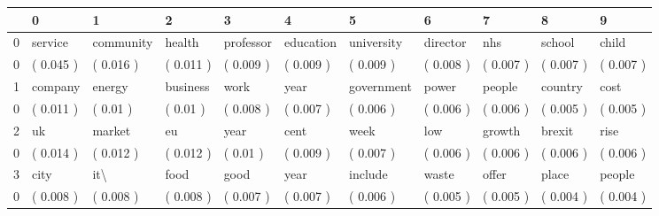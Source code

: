 \begin{tabular}{lllllllllll}
\toprule
{} &          0 &          1 &          2 &          3 &          4 &           5 &          6 &          7 &          8 &          9 \\
\midrule
0 &    service &  community &     health &  professor &  education &  university &   director &        nhs &     school &      child \\
0 &  ( 0.045 ) &  ( 0.016 ) &  ( 0.011 ) &  ( 0.009 ) &  ( 0.009 ) &   ( 0.009 ) &  ( 0.008 ) &  ( 0.007 ) &  ( 0.007 ) &  ( 0.007 ) \\
1 &    company &     energy &   business &       work &       year &  government &      power &     people &    country &       cost \\
0 &  ( 0.011 ) &   ( 0.01 ) &   ( 0.01 ) &  ( 0.008 ) &  ( 0.007 ) &   ( 0.006 ) &  ( 0.006 ) &  ( 0.006 ) &  ( 0.005 ) &  ( 0.005 ) \\
2 &         uk &     market &         eu &       year &       cent &        week &        low &     growth &     brexit &       rise \\
0 &  ( 0.014 ) &  ( 0.012 ) &  ( 0.012 ) &   ( 0.01 ) &  ( 0.009 ) &   ( 0.007 ) &  ( 0.006 ) &  ( 0.006 ) &  ( 0.006 ) &  ( 0.006 ) \\
3 &       city &        it\textbackslash  &       food &       good &       year &     include &      waste &      offer &      place &     people \\
0 &  ( 0.008 ) &  ( 0.008 ) &  ( 0.008 ) &  ( 0.007 ) &  ( 0.007 ) &   ( 0.006 ) &  ( 0.005 ) &  ( 0.005 ) &  ( 0.004 ) &  ( 0.004 ) \\
\bottomrule
\end{tabular}
